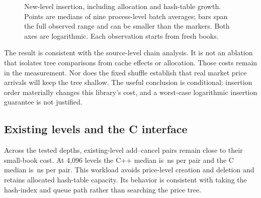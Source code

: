 \documentclass[10pt,letterpaper,twocolumn]{article}
\begin{document}
\begin{figure}[t]
\centering
{}
\caption{New-level insertion, including allocation and hash-table growth.
Points are medians of nine process-level batch averages; bars span the full
observed range and can be smaller than the markers. Both axes are logarithmic.
Each observation starts from fresh books.}
\label{fig:insertion}
\end{figure}

The result is consistent with the source-level chain analysis. It is not an
ablation that isolates tree comparisons from cache effects or allocation.
Those costs remain in the measurement. Nor does the fixed shuffle establish
that real market price arrivals will keep the tree shallow. The useful
conclusion is conditional: insertion order materially changes this library's
cost, and a worst-case logarithmic insertion guarantee is not justified.

\balance
\subsection{Existing levels and the C interface}
Across the tested depths, existing-level add--cancel pairs remain close to
their small-book cost. At 4,096 levels the C++ median is \StudyPairCpp{}\,ns per
pair and the C median is \StudyPairC{}\,ns per pair. This workload avoids
price-level creation and deletion and retains allocated hash-table capacity.
Its behavior is consistent with taking the hash-index and queue path rather
than searching the price tree.
\end{document}
